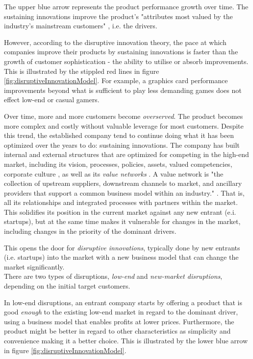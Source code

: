 \documentclass[a4paper,10pt]{book}
\begin{document}
The upper blue arrow represents the product performance growth over time. The sustaining innovations improve 
the product's "attributes most valued by the industry's mainstream customers" \cite{innovatorsSolution}, i.e. the drivers. 

However, according to the disruptive innovation theory, the pace at which companies improve their products by sustaining innovations is faster than 
the growth of customer sophistication - the ability to utilise or absorb improvements. 
This is illustrated by the stippled red lines in figure \ref{fig:disruptiveInnovationModel}. For example, a graphics card performance improvements
beyond what is sufficient to play less demanding games does not effect low-end or casual gamers.

Over time, more and more customers become \emph{overserved}. The product becomes more complex and costly without valuable leverage for most customers. 
Despite this trend, the established company tend to continue doing what it has been optimized over the years to do: sustaining innovations.
The company has built internal and external structures that are optimized for competing in the high-end market, 
including its vision, processes, policies, assets, valued competencies, corporate culture \cite{scientificArticlePredictingTheUnpredictable}, 
as well as its \emph{value networks} \cite{innovatorsDilemma}.
A value network is "the collection of upstream suppliers, downstream channels to market, 
  and ancillary providers that support a common business model within an industry." \cite{innovatorsDilemma}. 
That is, all its relationships and integrated processes with partners within the market.
This solidifies its position in the current market against any new entrant (e.i. startups), 
but at the same time makes it vulnerable for changes in the market, including changes in the priority of the dominant drivers.


This opens the door for \emph{disruptive innovations}, typically done by new entrants (i.e. startups) into the market with a new business model 
that can change the market significantly. \\

There are two types of disruptions, \emph{low-end} and \emph{new-market disruptions}, depending on the initial target customers.

In low-end disruptions, an entrant company starts by offering a product that is good \emph{enough} to the existing low-end market in regard
to the dominant driver, using a business model that enables profits at lower prices. 
Furthermore, the product might be better in regard to other characteristics as simplicity and convenience \cite{innovatorsSolution} 
making it a better choice.
This is illustrated by the lower blue arrow in figure \ref{fig:disruptiveInnovationModel}.
\end{document}
